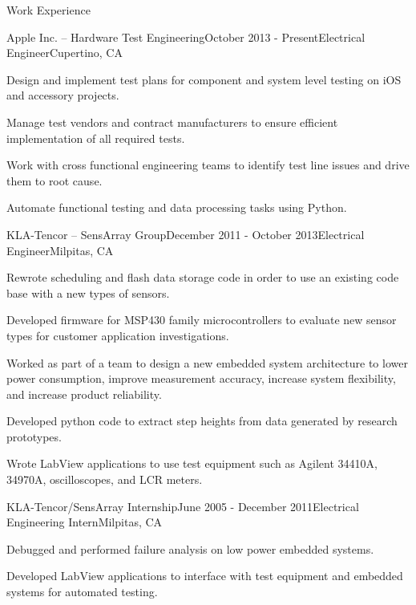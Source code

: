 \documentclass{resume} %
\begin{document}
\vspace{0.5em}
\begin{rSection}{Work Experience}
\vspace{-0.5em}
\begin{rSubsection}{Apple Inc. -- Hardware Test Engineering}{October 2013 - Present}{Electrical Engineer}{Cupertino, CA}
\item Design and implement test plans for component and system level testing on iOS and accessory projects.
\item Manage test vendors and contract manufacturers to ensure efficient implementation of all required tests.
\item Work with cross functional engineering teams to identify test line issues and drive them to root cause.
\item Automate functional testing and data processing tasks using Python.
\end{rSubsection}


\ssquish
\begin{rSubsection}{KLA-Tencor -- SensArray Group}{December 2011 - October 2013}{Electrical Engineer}{Milpitas, CA}
\item Rewrote scheduling and flash data storage code in order to use an existing code base with a new types of sensors.
\item Developed firmware for MSP430 family microcontrollers to evaluate new sensor types for customer application investigations.
\item Worked as part of a team to design a new embedded system architecture to lower power consumption, improve measurement accuracy, increase system flexibility, and increase product reliability.
\item Developed python code to extract step heights from data generated by research prototypes.
\item Wrote LabView applications to use test equipment such as Agilent 34410A, 34970A, oscilloscopes, and LCR meters.
\end{rSubsection}

\pagebreak[2]
\ssquish
\begin{rSubsection}{KLA-Tencor/SensArray Internship}{June 2005 - December 2011}{Electrical Engineering Intern}{Milpitas, CA}
\item Debugged and performed failure analysis on low power embedded systems. 
\item Developed LabView applications to interface with test equipment and embedded systems for automated testing.
\end{rSubsection}
\end{rSection}
\end{document}
